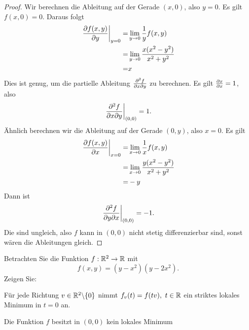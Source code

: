\begin{proof}
	Wir berechnen die Ableitung auf der Gerade $(x,0)$, also $y=0$. Es gilt $f(x,0)=0$. Daraus folgt
	\begin{align*}
		\left.	\pdv{f(x,y)}{y}\right|_{y=0}=&\lim_{y \to 0} \frac{1}{y}f(x,y)\\
		=&\lim_{y \to 0} \frac{x(x^2-y^2)}{x^2+y^2}\\
		=&x
	\end{align*}
	Dies ist genug, um die partielle Ableitung $\pdv{f}{x}{y}$ zu berechnen. Es gilt $\pdv{x}{x}=1$, also
	\[
		\left.\pdv{f}{x}{y}\right|_{(0,0)}=1
	.\] 
	Ähnlich berechnen wir die Ableitung auf der Gerade $(0,y)$, also $x=0$. Es gilt
	\begin{align*}
		\left.\pdv{f(x,y)}{x}\right|_{x=0}=&\lim_{x \to 0} \frac{1}{x}f(x,y)\\
			=&\lim_{x \to 0} \frac{y(x^2-y^2)}{x^2+y^2}\\
			=&-y
	\end{align*}
	Dann ist
	\[
		\left.\pdv{f}{y}{x}\right|_{(0,0)}=-1
	.\] 
	Die sind ungleich, also $f$ kann in $(0,0)$ nicht stetig differenzierbar sind, sonst wären die Ableitungen gleich.
\end{proof}
\begin{Problem}
	Betrachten Sie die Funktion $f:\mathbb{R}^2\to\mathbb{R}$ mit
	\[
	f(x,y)=(y-x^2)(y-2x^2)
	.\] 
	Zeigen Sie:
	\begin{parts}
	\item F\"{u}r jede Richtung $v\in \mathbb{R}^2\backslash \{0\} $ nimmt $f_v(t)=f(tv),~t\in \mathbb{R}$ ein striktes lokales Minimum in $t=0$ an.
	\item Die Funktion $f$ besitzt in $(0,0)$ kein lokales Minimum
	\end{parts}
\end{Problem}

